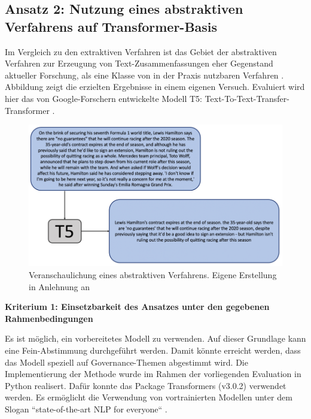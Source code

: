\subsection{Ansatz 2: Nutzung eines abstraktiven Verfahrens auf Transformer-Basis}

Im Vergleich zu den extraktiven Verfahren ist das Gebiet der abstraktiven Verfahren zur Erzeugung von Text-Zusammenfassungen eher Gegenstand aktueller Forschung, als eine Klasse von in der Praxis nutzbaren Verfahren \cite[S. 261]{Gupta}. Abbildung \cite{Abbildung:t5} zeigt die erzielten Ergebnisse in einem eigenen Versuch. Evaluiert wird hier das von Google-Forschern entwickelte Modell T5: Text-To-Text-Transfer-Transformer \cite{Raffel}.

\begin{figure}[h]
\centering
\includegraphics[scale=0.95]{content/pics/Picture_22.png}
\caption{Veranschaulichung eines abstraktiven Verfahrens. Eigene Erstellung in Anlehnung an \cite{Raffel}}
\label{Abbildung:t5}
\end{figure}

{\bf Kriterium 1: Einsetzbarkeit des Ansatzes unter den gegebenen Rahmenbedingungen}

Es ist möglich, ein vorbereitetes Modell  zu verwenden. Auf dieser Grundlage kann eine Fein-Abstimmung durchgeführt werden. Damit könnte erreicht werden, dass das Modell speziell auf Governance-Themen abgestimmt wird. Die Implementierung der Methode wurde im Rahmen der vorliegenden Evaluation in Python realisert. Dafür konnte das Package Transformers (v3.0.2) verwendet werden. Es ermöglicht die Verwendung von vortrainierten Modellen unter dem Slogan ``state-of-the-art NLP for everyone`` \cite{Transformers}.

